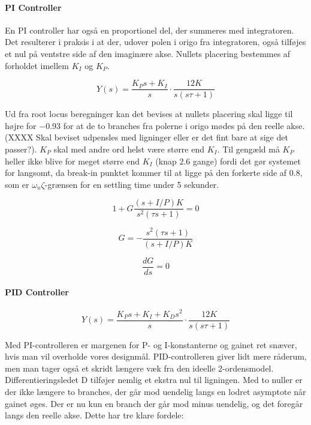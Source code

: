 \paragraph{PI Controller}

En PI controller har også en proportionel del, der summeres med integratoren. Det resulterer i praksis i at der, udover polen i origo fra integratoren, også tilføjes et nul på ventstre side af den imaginære akse. Nullets placering bestemmes af forholdet imellem $K_{I}$ og $K_{P}$.

\begin{equation}\label{PI_OpenLoop}
Y(s)=\frac{K_{P}s+K_{I}}{s}\cdot\frac{12K}{s(s\tau+1)}
\end{equation}

Ud fra root locus beregninger kan det bevises at nullets placering skal ligge til højre for $-0.93$ for at de to branches fra polerne i origo mødes på den reelle akse. (XXXX Skal beviset udpensles med ligninger eller er det fint bare at sige det passer?). $K_{P}$ skal med andre ord helst være større end $K_{I}$. Til gengæld må $K_{P}$ heller ikke blive for meget større end $K_{I}$ (knap $2.6$ gange) fordi det gør systemet for langsomt, da break-in punktet kommer til at ligge på den forkerte side af $0.8$, som er $\omega_{n}\zeta$-grænsen for en settling time under 5 sekunder. 

\begin{equation}
1+G\frac{(s+I/P)K}{s^2(\tau s+1)}=0
\end{equation}

\begin{equation}
G=-\frac{s^2(\tau s+1)}{(s+I/P)K}
\end{equation}

\begin{equation}
\frac{dG}{ds}=0
\end{equation}



\paragraph{PID Controller}

\begin{equation}\label{PID_OpenLoop}
Y(s)=\frac{K_{P}s+K_{I}+K_{D}s^2}{s}\cdot\frac{12K}{s(s\tau+1)}
\end{equation}

Med PI-controlleren er margenen for P- og I-konstanterne og gainet ret snæver, hvis man vil overholde vores designmål. PID-controlleren giver lidt mere råderum, men man tager også et skridt længere væk fra den ideelle 2-ordensmodel. Differentieringsledet D tilføjer nemlig et ekstra nul til ligningen. Med to nuller er der ikke længere to branches, der går mod uendelig langs en lodret asymptote når gainet øges. Der er nu kun en branch der går mod minus uendelig, og det foregår langs den reelle akse. Dette har tre klare fordele:

